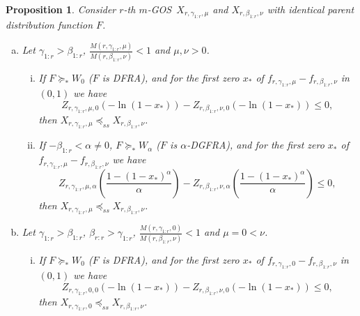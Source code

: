 \documentclass [11pt]{article}
\newtheorem{proposition}{Proposition}
\newcommand{\gos}{GOS}
\begin{document}
\begin{proposition}\label{p1}
Consider $r$-th $m$-\gos\ $X_{r,\gamma_{1:r},\mu}$ and $X_{r,
\beta_{1:r},\nu}$ with identical parent distribution function $F$.
\begin{enumerate}[(a)]
\item
Let $\gamma_{1:r} > \beta_{1:r}$, $\frac{M(r,\gamma_{1:r},\mu)}{M(r,\beta_{1:r},\nu)}<1$ and $\mu,\nu >0$.
    \begin{enumerate}[(i)]
    \item
    If $F \succeq_* W_0$ ($F$ is  DFRA), and for the first zero $x_*$ of $f_{r, \gamma_{1:r}, \mu} - f_{r,\beta_{1:r}, \nu}$
    in $(0,1)$ we have
    \begin{equation*}
    \label{25f}
    Z_{r, \gamma_{1:r}, \mu, 0}(-\ln (1-x_*)) -
    Z_{r, \beta_{1:r}, \nu, 0}(-\ln (1-x_*)) \leq 0,
    \end{equation*}
    then $X_{r,\gamma_{1:r}, \mu} \preceq_{ss}X_{r, \beta_{1:r},\nu}$.

    \item
    If $-\beta_{1:r} <\alpha\neq 0$,  $F \succeq_* W_\alpha$ ($F$ is $\alpha$-DGFRA), and for the first zero  $x_*$ of $f_{r, \gamma_{1:r}, \mu} - f_{r,\beta_{1:r}, \nu}$ we have
    \begin{equation*}
    \label{25g}
    Z_{r, \gamma_{1:r}, \mu, \alpha}\left(\frac{1-(1-x_*)^\alpha}{\alpha}
    \right) -
    Z_{r, \beta_{1:r}, \nu, \alpha}\left(\frac{1-(1-x_*)^\alpha}{\alpha}
    \right)  \leq 0,
    \end{equation*}
    then $X_{r,\gamma_{1:r}, \mu} \preceq_{ss} X_{r, \beta_{1:r},\nu}$.
    \end{enumerate}

\item
Let $\gamma_{1:r} > \beta_{1:r}$,  $\beta_{r:r} > \gamma_{1:r}$, 
$\frac{M(r,\gamma_{1:r},0)}{M(r,\beta_{1:r},\nu)}<1$ and $\mu=0 <\nu$.
    \begin{enumerate}[(i)]
    \item
    If $F \succeq_* W_0$ ($F$ is DFRA), and for the first zero $x_*$ of $f_{r, \gamma_{1:r}, 0} - f_{r,\beta_{1:r}, \nu}$ in $(0,1)$ we have
    \begin{equation*}
    \label{25h}
    Z_{r, \gamma_{1:r}, 0, 0}(-\ln (1-x_*)) -
    Z_{r, \beta_{1:r}, \nu, 0}(-\ln (1-x_*)) \leq 0,
    \end{equation*}
    then $X_{r,\gamma_{1:r}, 0} \preceq_{ss}X_{r, \beta_{1:r},\nu}$.


\end{enumerate}
\end{enumerate}
\end{proposition}
\end{document}
